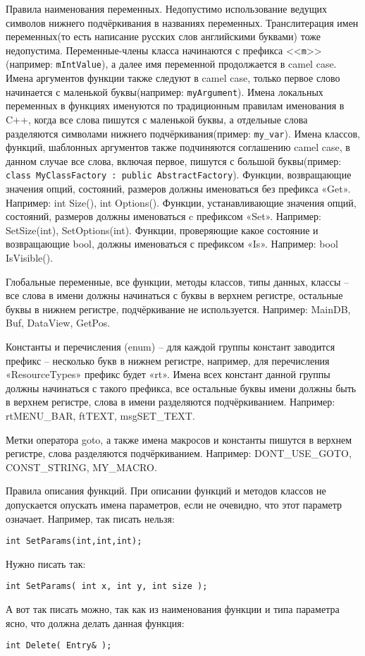 \documentclass{article}
\begin{document}
\vskip0.5cm
\Large Правила наименования переменных.
\normalsize
\vskip0.5cm
Недопустимо использование ведущих символов нижнего подчёркивания в названиях переменных. Транслитерация имен переменных(то есть написание русских слов английскими буквами) тоже недопустима.
Переменные-члены класса начинаются с префикса <<\texttt{m}>>(например: \texttt{mIntValue}), а далее имя переменной продолжается в camel case. 
Имена аргументов функции также следуют в camel case, только первое слово начинается с маленькой буквы(например: \texttt{myArgument}). 
Имена локальных переменных в функциях именуются по традиционным правилам именования в C++, когда все слова пишутся с маленькой буквы, а отдельные слова разделяются символами нижнего подчёркивания(пример: \texttt{my\_var}). Имена классов, функций, шаблонных аргументов также подчиняются соглашению camel case, в данном случае все слова, включая первое, пишутся с большой буквы(пример: \texttt{class MyClassFactory : public AbstractFactory}).
Функции, возвращающие значения опций, состояний, размеров должны именоваться без префикса «Get». Например: int Size(),  int Options().
Функции, устанавливающие значения опций, состояний, размеров должны именоваться c префиксом «Set». Например: SetSize(int),  SetOptions(int).
Функции, проверяющие какое состояние и возвращающие bool,  должны именоваться с префиксом «Is». Например: bool IsVisible().


Глобальные переменные, все функции, методы классов, типы данных, классы – все слова в имени должны начинаться с буквы в верхнем регистре, остальные буквы в нижнем регистре, подчёркивание не используется. Например: MainDB, Buf, DataView, GetPos.


Константы и перечисления (enum) – для каждой группы констант заводится префикс – несколько букв в нижнем регистре, например, для перечисления «ResourceTypes» префикс будет «rt». Имена всех констант данной группы должны начинаться с такого префикса, все остальные буквы имени должны быть в верхнем регистре, слова в имени разделяются подчёркиванием. Например: rtMENU\_BAR, ftTEXT, msgSET\_TEXT.


Метки оператора goto, а также имена макросов и константы пишутся в верхнем регистре, слова разделяются подчёркиванием. Например: DONT\_USE\_GOTO, CONST\_STRING, MY\_MACRO.

\vskip0.5cm
\Large Правила описания функций.
\normalsize
\vskip0.5cm
При описании функций и методов классов не допускается опускать имена параметров, если не очевидно, что этот параметр означает. Например, так писать нельзя:
\begin{lstlisting}
int SetParams(int,int,int); 
\end{lstlisting}
Нужно писать так:
\begin{lstlisting}
int SetParams( int x, int y, int size );
\end{lstlisting}
А вот так писать можно, так как из наименования функции и типа параметра ясно, что должна делать данная функция:
\begin{lstlisting}
int Delete( Entry& ); 
\end{lstlisting}
\end{document}

